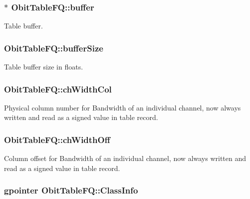 \subsubsection{$\ast$ {\bf Obit\-Table\-FQ::buffer}}\label{structObitTableFQ_o10}


Table buffer. 

\subsubsection{ {\bf Obit\-Table\-FQ::buffer\-Size}}\label{structObitTableFQ_o11}


Table buffer size in floats. 

\subsubsection{ {\bf Obit\-Table\-FQ::ch\-Width\-Col}}\label{structObitTableFQ_o21}


Physical column number for Bandwidth of an individual channel, now always written and read as a signed value in table record. 

\subsubsection{ {\bf Obit\-Table\-FQ::ch\-Width\-Off}}\label{structObitTableFQ_o20}


Column offset for Bandwidth of an individual channel, now always written and read as a signed value in table record. 

\subsubsection{\setlength{\rightskip}{0pt plus 5cm}gpointer {\bf Obit\-Table\-FQ::Class\-Info}}\label{structObitTableFQ_o1}


